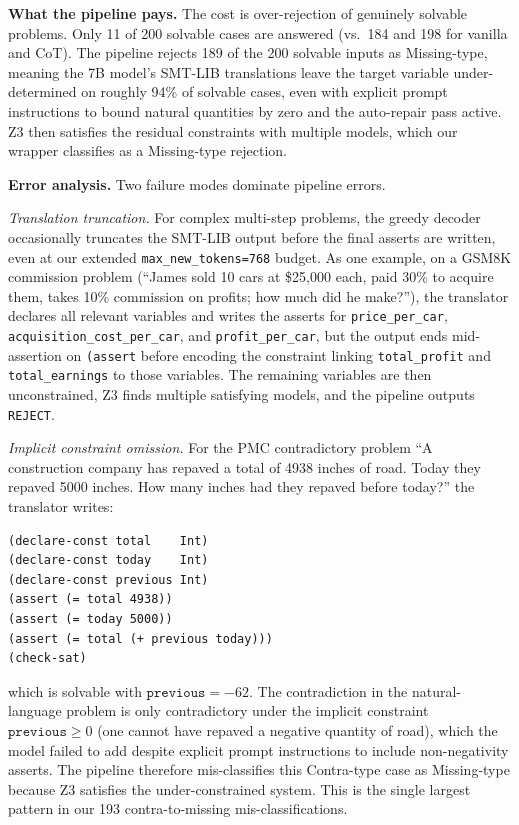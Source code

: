 \documentclass[sigconf, nonacm, onecolumn]{acmart}
\begin{document}
\textbf{What the pipeline pays.} The cost is over-rejection of genuinely
solvable problems. Only 11 of 200 solvable cases are answered (vs.\ 184
and 198 for vanilla and CoT). The pipeline rejects 189 of the 200 solvable
inputs as Missing-type, meaning the 7B model's SMT-LIB translations leave
the target variable under-determined on roughly 94\% of solvable cases,
even with explicit prompt instructions to bound natural quantities by zero
and the auto-repair pass active. Z3 then satisfies the residual
constraints with multiple models, which our wrapper classifies as a
Missing-type rejection.

\textbf{Error analysis.} Two failure modes dominate pipeline errors.

\emph{Translation truncation.} For complex multi-step problems, the
greedy decoder occasionally truncates the SMT-LIB output before the
final asserts are written, even at our extended \texttt{max\_new\_tokens=768}
budget. As one example, on a GSM8K commission problem (``James sold 10
cars at \$25{,}000 each, paid 30\% to acquire them, takes 10\%
commission on profits; how much did he make?''), the translator
declares all relevant variables and writes the asserts for
\texttt{price\_per\_car}, \texttt{acquisition\_cost\_per\_car}, and
\texttt{profit\_per\_car}, but the output ends mid-assertion on
\texttt{(assert} before encoding the constraint linking
\texttt{total\_profit} and \texttt{total\_earnings} to those variables.
The remaining variables are then unconstrained, Z3 finds multiple
satisfying models, and the pipeline outputs \texttt{REJECT}.

\emph{Implicit constraint omission.} For the PMC contradictory problem
``A construction company has repaved a total of 4938 inches of road.
Today they repaved 5000 inches. How many inches had they repaved
before today?'' the translator writes:

\begin{verbatim}
(declare-const total    Int)
(declare-const today    Int)
(declare-const previous Int)
(assert (= total 4938))
(assert (= today 5000))
(assert (= total (+ previous today)))
(check-sat)
\end{verbatim}

\noindent which is solvable with $\texttt{previous} = -62$. The
contradiction in the natural-language problem is only contradictory
under the implicit constraint $\texttt{previous} \geq 0$ (one cannot
have repaved a negative quantity of road), which the model failed to
add despite explicit prompt instructions to include non-negativity
asserts. The pipeline therefore mis-classifies this Contra-type case
as Missing-type because Z3 satisfies the under-constrained system. This
is the single largest pattern in our 193 contra-to-missing
mis-classifications.
\end{document}
